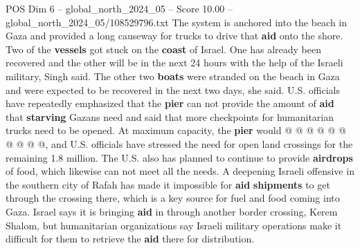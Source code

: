 \begin{textsample}{POS Dim 6 – global\_north\_2024\_05 – Score 10.00 – global\_north\_2024\_05/108529796.txt}
The system is anchored into the beach in Gaza and provided a long causeway for trucks to drive that \textbf{aid} onto the shore.
Two of the \textbf{vessels} got stuck on the \textbf{coast} of Israel.
One has already been recovered and the other will be in the next 24 hours with the help of the Israeli military, Singh said.
The other two \textbf{boats} were stranded on the beach in Gaza and were expected to be recovered in the next two days, she said.
U.S. officials have repeatedly emphasized that the \textbf{pier} can not provide the amount of \textbf{aid} that \textbf{starving} Gazans need and said that more checkpoints for humanitarian trucks need to be opened.
At maximum capacity, the \textbf{pier} would @ @ @ @ @ @ @ @ @ @, and U.S. officials have stressed the need for open land crossings for the remaining 1.8 million.
The U.S. also has planned to continue to provide \textbf{airdrops} of food, which likewise can not meet all the needs.
A deepening Israeli offensive in the southern city of Rafah has made it impossible for \textbf{aid} \textbf{shipments} to get through the crossing there, which is a key source for fuel and food coming into Gaza.
Israel says it is bringing \textbf{aid} in through another border crossing, Kerem Shalom, but humanitarian organizations say Israeli military operations make it difficult for them to retrieve the \textbf{aid} there for distribution.

\end{textsample}
